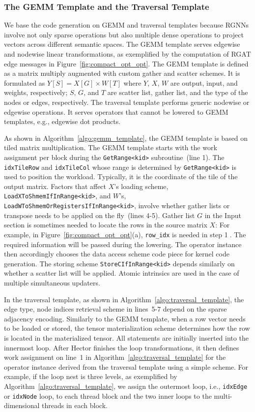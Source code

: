 \subsubsection{The GEMM Template and the Traversal Template}\label{sec:two_templates}
We base the code generation on GEMM and traversal templates because RGNNs involve not only sparse operations but also multiple dense operations to project vectors across different semantic spaces.
The GEMM template serves edgewise and nodewise linear transformations, as exemplified by the computation of RGAT edge messages in Figure~\ref{fig:compact_opt_opt}. The GEMM template is defined as a matrix multiply augmented with custom gather and scatter schemes. It is formulated as $Y[S] = X[G] \times W[T]$ where $Y$, $X$, $W$ are output, input, and weights, respectively; $S$, $G$, and $T$ are scatter list, gather list, and the type of the nodes or edges, respectively. 
The traversal template performs generic nodewise or edgewise operations. It serves operators that cannot be lowered to GEMM templates, e.g., edgewise dot products.

As shown in Algorithm~\ref{algo:gemm_template}, the GEMM template is based on tiled matrix multiplication. The GEMM template starts with %
the work assignment per block during the \texttt{GetRange<kid>} subroutine~(line 1). 
The \texttt{idxTileRow} and \texttt{idxTileCol} whose range is determined by \texttt{GetRange<kid>} is used to position the workload.
Typically, it is the coordinate of the tile of the output matrix.
Factors that affect $X$'s loading scheme, \texttt{LoadXToShmemIfInRange<kid>}, and $W$'s, \texttt{LoadWToShmemOrRegistersIfInRange<kid>}, involve whether gather lists or transpose needs to be applied on the fly~(lines 4-5).
Gather list $G$ in the Input section is sometimes needed to locate the rows in the source matrix $X$: For example, in Figure~\ref{fig:compact_opt_opt}(a), \texttt{row\_idx} is needed in step \textcircled{1}.
The required information will be passed during the lowering.
The operator instance then accordingly chooses the data access scheme code piece for kernel code generation.
The storing scheme \texttt{StoreCIfInRange<kid>} depends similarly on whether a scatter list will be applied. 
Atomic intrinsics are used in the case of multiple simultaneous updaters.




In the traversal template, as shown in
Algorithm~\ref{algo:traversal_template}, the edge type, node indices retrieval scheme in lines~5-7 depend on the sparse adjacency encoding.
Similarly to the GEMM template, when a row vector needs to be loaded or stored, the tensor materialization scheme determines how the row is located in the materialized tensor.
All statements are initially inserted into the innermost loop. 
After Hector finishes the loop transformations, it then defines work assignment on line~1 in Algorithm~\ref{algo:traversal_template} for the operator instance derived from the traversal template using a simple scheme. For example, if the loop nest is three levels, as exemplified by Algorithm~\ref{algo:traversal_template}, we assign the outermost loop, i.e., \texttt{idxEdge} or \texttt{idxNode} loop, to each thread block and the two inner loops to the multi-dimensional threads in each block.



